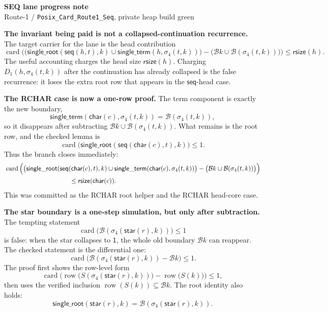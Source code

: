 \documentclass[11pt]{article}
\newcommand{\B}{\mathcal B}
\newcommand{\sr}{\mathsf{single\_root}}
\newcommand{\st}{\mathsf{single\_term}}
\newcommand{\s}{\sigma_4}
\newcommand{\Sraw}{S}
\newcommand{\rsize}{\mathsf{rsize}}
\newcommand{\D}{D_1}
\newcommand{\RONE}{\mathsf{1}}
\newcommand{\RCHAR}{\mathsf{char}}
\newcommand{\RSEQ}{\mathsf{seq}}
\newcommand{\RSTAR}{\mathsf{star}}
\begin{document}
{\Large\bfseries SEQ lane progress note}\\[-0.15em]
{\small Route-1 / \texttt{Posix\_Card\_Route1\_Seq}, private heap build green}

\vspace{0.6em}

\textbf{The invariant being paid is not a collapsed-continuation recurrence.}
The target carrier for the lane is the head contribution
\[
  \operatorname{card}\Big(
    \big(\sr(\RSEQ(h,t),k)\cup \st(h,\s(t,k))\big)
      - \big(\B k\cup \B(\s(t,k))\big)\Big)
  \le \rsize(h).                                      \tag{SEQ}
\]
The useful accounting charges the head size \(\rsize(h)\).  Charging
\(\D(h,\s(t,k))\) after the continuation has already collapsed is the false
recurrence: it loses the extra root row that appears in the \(\RSEQ\)-head
case.

\textbf{The RCHAR case is now a one-row proof.}
The term component is exactly the new boundary,
\[
  \st(\RCHAR(c),\s(t,k))=\B(\s(t,k)),
\]
so it disappears after subtracting
\(\B k\cup \B(\s(t,k))\).  What remains is the root row, and the checked
lemma is
\[
  \operatorname{card}\big(\sr(\RSEQ(\RCHAR(c),t),k)\big)\le 1.      \tag{RCHAR-root}
\]
Thus the branch closes immediately:
\begin{align*}
  &\operatorname{card}\Big(
    \big(\sr(\RSEQ(\RCHAR(c),t),k)\cup
          \st(\RCHAR(c),\s(t,k))\big)
      -\big(\B k\cup \B(\s(t,k))\big)\Big)\\
  &\hspace{35mm}\le \rsize(\RCHAR(c)).
\end{align*}
This was committed as the RCHAR root helper and the RCHAR head-core case.

\textbf{The star boundary is a one-step simulation, but only after subtraction.}
The tempting statement
\[
  \operatorname{card}\big(\B(\s(\RSTAR(r),k))\big)\le 1
\]
is false: when the star collapses to \(\RONE\), the whole old boundary
\(\B k\) can reappear.  The checked statement is the differential one:
\[
  \operatorname{card}\big(\B(\s(\RSTAR(r),k))-\B k\big)\le 1.       \tag{STAR-boundary}
\]
The proof first shows the row-level form
\[
  \operatorname{card}\Big(
      \operatorname{row}\big(\Sraw(\s(\RSTAR(r),k))\big)
      -\operatorname{row}\big(\Sraw(k)\big)\Big)\le 1,
\]
then uses the verified inclusion
\(\operatorname{row}(\Sraw(k))\subseteq \B k\).  The root identity also holds:
\[
  \sr(\RSTAR(r),k)=\B(\s(\RSTAR(r),k)).                            \tag{STAR-root}
\]
\end{document}
